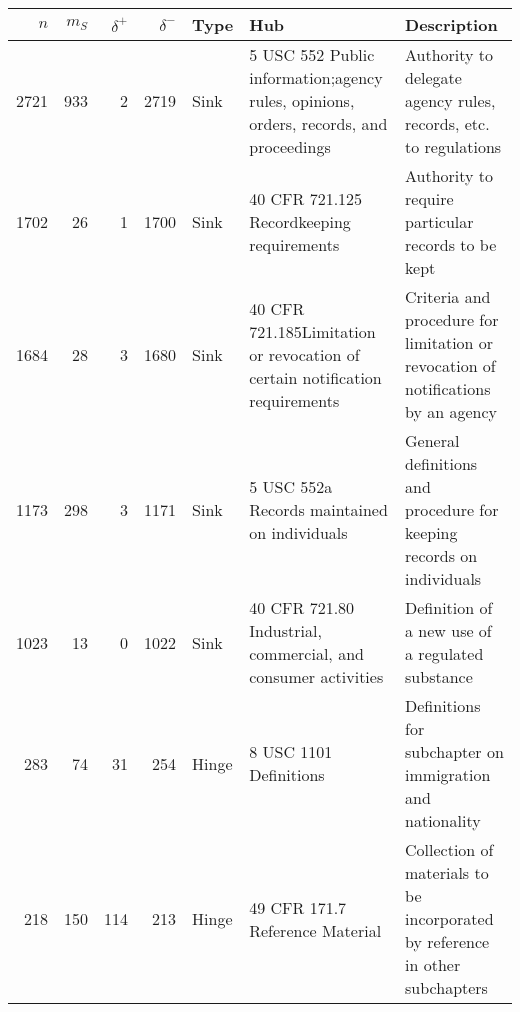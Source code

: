 \documentclass[utf8,sort&compress,table,hidelinks]{frontiersFPHY} %
\begin{document}
\begin{table}
	\centering
\renewcommand{\arraystretch}{1.5}
\renewcommand{\footnotesize}{\fontsize{6.5pt}{8pt}\selectfont}
\footnotesize
	\begin{tabular}{rrrrlp{}p{}}
\toprule
   $n$ &   $m_S$ &   $\delta^+$ &   $\delta^-$ & \textbf{Type}   & \textbf{Hub}                                                                      & \textbf{Description}   \\
\midrule
  2721 &     933 &            2 &         2719 & Sink            & 5 USC 552 Public information;\newline agency rules, opinions, orders, records, and proceedings                            & Authority to delegate agency rules, records, etc. to regulations                       \\
  \rowcolor{lightgray!30}1702 &      26 &            1 &         1700 & Sink            & 40 CFR 721.125 Recordkeeping requirements                                   & Authority to require particular records to be kept                        \\
  \rowcolor{lightgray!30}1684 &      28 &            3 &         1680 & Sink            & 40 CFR 721.185\newline Limitation or revocation of certain notification requirements& Criteria and procedure for limitation or revocation of notifications by an agency                        \\
  1173 &     298 &            3 &         1171 & Sink            & 5 USC 552a Records maintained on individuals                          & General definitions and procedure for keeping records on individuals                        \\
  \rowcolor{lightgray!30}1023 &      13 &            0 &         1022 & Sink            & 40 CFR 721.80 Industrial, commercial, and consumer activities                & Definition of a new use of a regulated substance                        \\
   283 &      74 &           31 &          254 & Hinge           & 8 USC 1101 Definitions                                          & Definitions for subchapter on immigration and nationality                         \\
   \rowcolor{lightgray!30}218 &     150 &          114 &          213 & Hinge           & 49 CFR 171.7 Reference Material                                              & Collection of materials to be incorporated by reference in other subchapters                       \\

\end{tabular}
\end{table}
\end{document}
